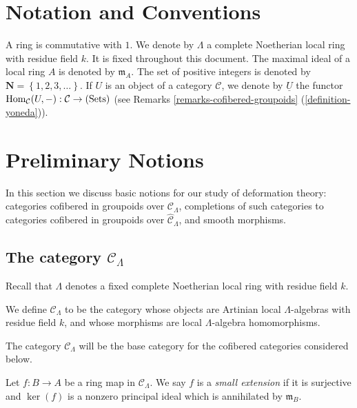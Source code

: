 \section{Notation and Conventions}
\label{section-notations-conventions}
\noindent
A ring is commutative with $1$. We denote by $\Lambda$ a complete Noetherian 
local ring with residue field $k$.  It is fixed throughout this document.  The 
maximal ideal of a local ring $A$ is denoted by $\mathfrak{m}_{A}$. The set of 
positive integers is denoted by $\mathbf{N} = \left\{1,2,3,\dots \right\}$.
If $U$ is an object of a category $\mathcal C$, we denote by $\underline{U}$ 
the functor $\textnormal{Hom}_{\mathcal C}(U,-): \mathcal C \rightarrow 
\textnormal{(Sets)}$ (see Remarks \ref{remarks-cofibered-groupoids} 
(\ref{definition-yoneda})).

\section{Preliminary Notions}
\noindent
In this section we discuss basic notions for our study of deformation theory: 
categories cofibered in groupoids over $\mathcal C_{\Lambda}$, completions of 
such categories to categories cofibered in groupoids over $\widehat{\mathcal 
C}_{\Lambda}$, and smooth morphisms.

\subsection{The category $\mathcal C_{\Lambda}$}
\label{subsection-CLambda}
Recall that $\Lambda$ denotes a fixed complete Noetherian local ring with 
residue field $k$.

\begin{definition}
\label{definition-CLambda}
We define $\mathcal C_{\Lambda}$ to be the category whose objects are Artinian 
local $\Lambda$-algebras with residue field $k$, and whose morphisms are local 
$\Lambda$-algebra homomorphisms.
\end{definition}

\noindent
The category $\mathcal C_{\Lambda}$ will be the base category for the cofibered 
categories considered below.

\begin{definition}
\label{definition-small-extension}
Let $f: B \rightarrow A$ be a ring map in $\mathcal C_{\Lambda}$.  We say $f$ 
is a \emph{small extension} if it is surjective and $\ker(f)$ is a nonzero 
principal ideal which is annihilated by $\mathfrak{m}_{B}$.
\end{definition}


